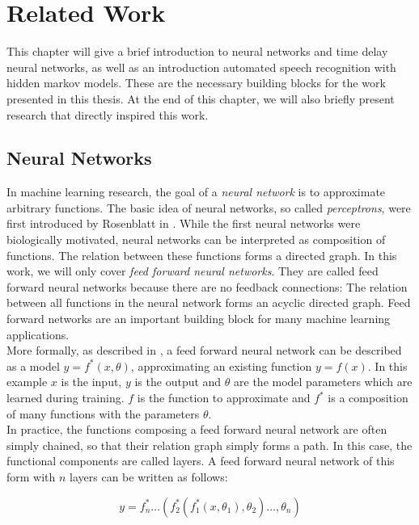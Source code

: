 
\chapter{Related Work}
\label{ch:realted_work}

This chapter will give a brief introduction to neural networks and time delay neural networks, as well as an introduction automated speech recognition with hidden markov models. These are the necessary building blocks for the work presented in this thesis. At the end of this chapter, we will also briefly present research that directly inspired this work. 

\section{Neural Networks}
\label{sec:neural_networks}

In machine learning research, the goal of a \textit{neural network} is to approximate arbitrary functions. The basic idea of neural networks, so called \textit{perceptrons}, were first introduced by Rosenblatt in \cite{rosenblatt1958perceptron}. While the first neural networks were biologically motivated, neural networks can be interpreted as composition of functions. The relation between these functions forms a directed graph. In this work, we will only cover \textit{feed forward neural networks}. They are called feed forward neural networks because there are no feedback connections: The relation between all functions in the neural network forms an acyclic directed graph. Feed forward networks are an important building block for many machine learning applications. 
\\
More formally, as described in \cite{Goodfellow-et-al-2016}, a feed forward neural network can be described as a model $y = f^*(x, \theta)$, approximating an existing function $y = f(x)$. In this example $x$ is the input, $y$ is the output and $\theta$ are the model parameters which are learned during training. $f$ is the function to approximate and $f^*$ is a composition of many functions with the parameters $\theta$. 
\\
In practice, the functions composing a feed forward neural network are often simply chained, so that their relation graph simply forms a path. In this case, the functional components are called layers. A feed forward neural network of this form with $n$ layers can be written as follows:

\[
y = f^*_n \dots (f^*_2(f^*_1(x, \theta_1), \theta_2) \dots, \theta_n)
\]

